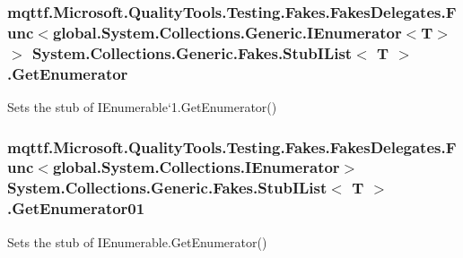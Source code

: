 \hypertarget{class_system_1_1_collections_1_1_generic_1_1_fakes_1_1_stub_i_list_3_01_t_01_4_a3bbfd4dd7d970a7f3493888e784c4f4f}{
\subsubsection[{Get\-Enumerator}]{\setlength{\rightskip}{0pt plus 5cm}mqttf.\-Microsoft.\-Quality\-Tools.\-Testing.\-Fakes.\-Fakes\-Delegates.\-Func$<$global.\-System.\-Collections.\-Generic.\-I\-Enumerator$<$T$>$ $>$ System.\-Collections.\-Generic.\-Fakes.\-Stub\-I\-List$<$ T $>$.Get\-Enumerator}}\label{class_system_1_1_collections_1_1_generic_1_1_fakes_1_1_stub_i_list_3_01_t_01_4_a3bbfd4dd7d970a7f3493888e784c4f4f}


Sets the stub of I\-Enumerable`1.Get\-Enumerator()

\hypertarget{class_system_1_1_collections_1_1_generic_1_1_fakes_1_1_stub_i_list_3_01_t_01_4_ae6f3edcfbbd96552c6beb0c690ae797e}{
\subsubsection[{Get\-Enumerator01}]{\setlength{\rightskip}{0pt plus 5cm}mqttf.\-Microsoft.\-Quality\-Tools.\-Testing.\-Fakes.\-Fakes\-Delegates.\-Func$<$global.\-System.\-Collections.\-I\-Enumerator$>$ System.\-Collections.\-Generic.\-Fakes.\-Stub\-I\-List$<$ T $>$.Get\-Enumerator01}}\label{class_system_1_1_collections_1_1_generic_1_1_fakes_1_1_stub_i_list_3_01_t_01_4_ae6f3edcfbbd96552c6beb0c690ae797e}


Sets the stub of I\-Enumerable.\-Get\-Enumerator()

